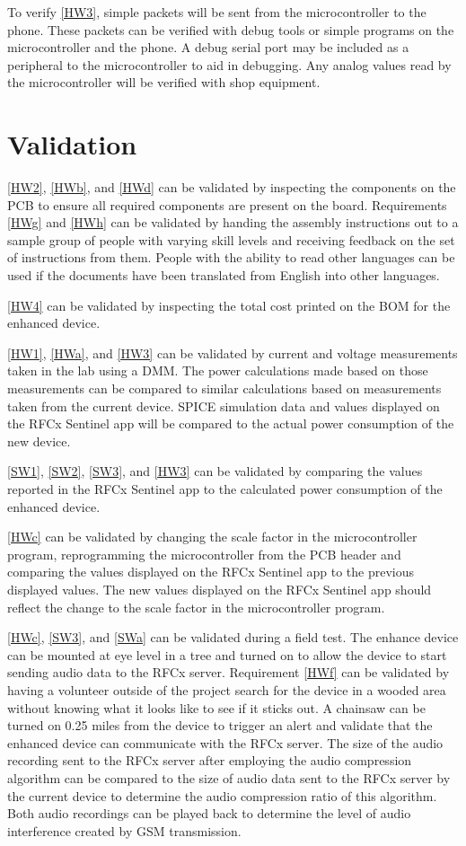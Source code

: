 \documentclass{article}
\begin{document}
{To verify \ref{HW3}, simple packets will be sent from the microcontroller to the phone. These packets can be verified with debug tools or simple programs on the microcontroller and the phone. A debug serial port may be included as a peripheral to the microcontroller to aid in debugging. Any analog values read by the microcontroller will be verified with shop equipment.

\section{Validation}
\ref{HW2}, \ref{HWb}, and \ref{HWd} can be validated by inspecting the components on the PCB to ensure all required components are present on the board. Requirements \ref{HWg} and \ref{HWh} can be validated by handing the assembly instructions out to a sample group of people with varying skill levels and receiving feedback on the set of instructions from them. People with the ability to read other languages can be used if the documents have been translated from English into other languages.

\ref{HW4} can be validated by inspecting the total cost printed on the BOM for the enhanced device.

\ref{HW1}, \ref{HWa}, and \ref{HW3} can be validated by current and voltage measurements taken in the lab using a DMM. The power calculations made based on those measurements can be compared to similar calculations based on measurements taken from the current device. SPICE simulation data and values displayed on the RFCx Sentinel app will be compared to the actual power consumption of the new device.

\ref{SW1}, \ref{SW2}, \ref{SW3}, and \ref{HW3} can be validated by comparing the values reported in the RFCx Sentinel app to the calculated power consumption of the enhanced device.

\ref{HWc} can be validated by changing the scale factor in the microcontroller program, reprogramming the microcontroller from the PCB header and comparing the values displayed on the RFCx Sentinel app to the previous displayed values. The new values displayed on the RFCx Sentinel app should reflect the change to the scale factor in the microcontroller program.

\ref{HWc}, \ref{SW3}, and \ref{SWa} can be validated during a field test. The enhance device can be mounted at eye level in a tree and turned on to allow the device to start sending audio data to the RFCx server. Requirement \ref{HWf} can be validated by having a volunteer outside of the project search for the device in a wooded area without knowing what it looks like to see if it sticks out. A chainsaw can be turned on 0.25 miles from the device to trigger an alert and validate that the enhanced device can communicate with the RFCx server. The size of the audio recording sent to the RFCx server after employing the audio compression algorithm can be compared to the size of audio data sent to the RFCx server by the current device to determine the audio compression ratio of this algorithm. Both audio recordings can be played back to determine the level of audio interference created by GSM transmission.

}
\end{document}
